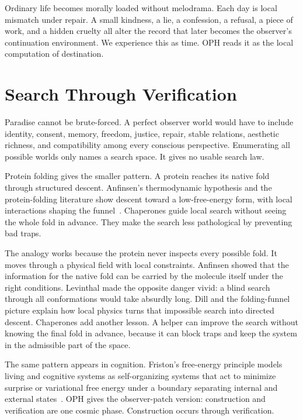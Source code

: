 \documentclass[11pt]{article}
\theoremstyle{remark}
\theoremstyle{plain}
\begin{document}
Ordinary life becomes morally loaded without melodrama. Each
day is local mismatch under repair. A small kindness, a lie, a confession, a
refusal, a piece of work, and a hidden cruelty all alter the record that later
becomes the observer's continuation environment. We experience this as time.
OPH reads it as the local computation of destination.

\section{Search Through Verification}

Paradise cannot be brute-forced. A perfect observer world would have to include
identity, consent, memory, freedom, justice, repair, stable relations, aesthetic
richness, and compatibility among every conscious perspective. Enumerating all
possible worlds only names a search space. It gives no usable search law.

Protein folding gives the smaller pattern. A protein reaches its native fold
through structured descent. Anfinsen's thermodynamic hypothesis and the
protein-folding literature show descent toward a low-free-energy form, with
local interactions shaping the funnel~\cite{Anfinsen1973,Levinthal1969,Dill1997}.
Chaperones guide local search without seeing the whole fold in advance. They
make the search less pathological by preventing bad traps.

The analogy works because the protein never inspects every possible fold.
It moves through a physical field with local constraints. Anfinsen showed that
the information for the native fold can be carried by the molecule itself under
the right conditions. Levinthal made the opposite danger vivid: a blind search
through all conformations would take absurdly long. Dill and the folding-funnel
picture explain how local physics turns that impossible search into directed
descent. Chaperones add another lesson. A helper can improve the search without
knowing the final fold in advance, because it can block traps and keep the
system in the admissible part of the space.

The same pattern appears in cognition. Friston's free-energy principle models
living and cognitive systems as self-organizing systems that act to minimize
surprise or variational free energy under a boundary separating internal and
external states~\cite{Friston2010,Friston2019}. OPH gives the observer-patch
version: construction and verification are one cosmic phase. Construction
occurs through verification.
\end{document}
